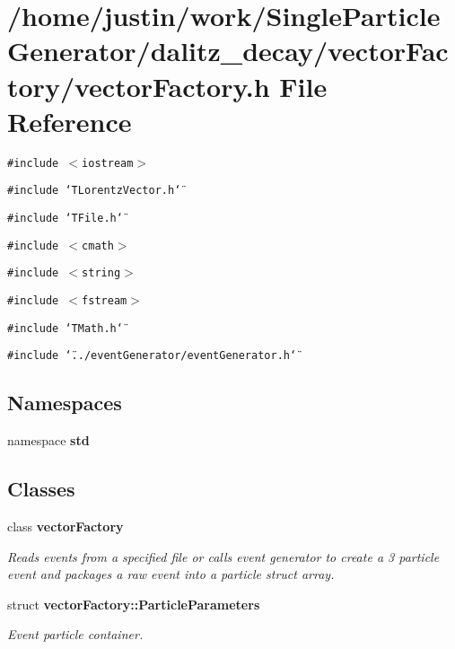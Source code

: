 \section{/home/justin/work/Single\-Particle\-Generator/dalitz\_\-decay/vector\-Factory/vector\-Factory.h File Reference}
\label{vectorFactory_8h}
{\tt \#include $<$iostream$>$}\par
{\tt \#include \char`\"{}TLorentz\-Vector.h\char`\"{}}\par
{\tt \#include \char`\"{}TFile.h\char`\"{}}\par
{\tt \#include $<$cmath$>$}\par
{\tt \#include $<$string$>$}\par
{\tt \#include $<$fstream$>$}\par
{\tt \#include \char`\"{}TMath.h\char`\"{}}\par
{\tt \#include \char`\"{}../event\-Generator/event\-Generator.h\char`\"{}}\par
\subsection*{Namespaces}
\begin{CompactItemize}
\item 
namespace \bf{std}
\end{CompactItemize}
\subsection*{Classes}
\begin{CompactItemize}
\item 
class \bf{vector\-Factory}
\begin{CompactList}\small\item\em Reads events from a specified file or calls event generator to create a 3 particle event and packages a raw event into a particle struct array. \item\end{CompactList}\item 
struct \bf{vector\-Factory::Particle\-Parameters}
\begin{CompactList}\small\item\em Event particle container. \item\end{CompactList}\end{CompactItemize}
